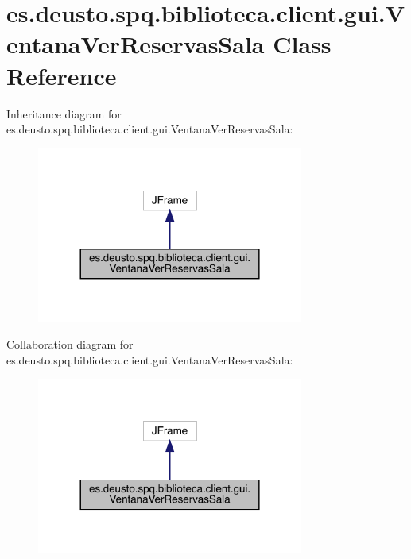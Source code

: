 \hypertarget{classes_1_1deusto_1_1spq_1_1biblioteca_1_1client_1_1gui_1_1_ventana_ver_reservas_sala}{}\section{es.\+deusto.\+spq.\+biblioteca.\+client.\+gui.\+Ventana\+Ver\+Reservas\+Sala Class Reference}
\label{classes_1_1deusto_1_1spq_1_1biblioteca_1_1client_1_1gui_1_1_ventana_ver_reservas_sala}


Inheritance diagram for es.\+deusto.\+spq.\+biblioteca.\+client.\+gui.\+Ventana\+Ver\+Reservas\+Sala\+:
\nopagebreak
\begin{figure}[H]
\begin{center}
\leavevmode
\includegraphics[width=248pt]{classes_1_1deusto_1_1spq_1_1biblioteca_1_1client_1_1gui_1_1_ventana_ver_reservas_sala__inherit__graph}
\end{center}
\end{figure}


Collaboration diagram for es.\+deusto.\+spq.\+biblioteca.\+client.\+gui.\+Ventana\+Ver\+Reservas\+Sala\+:
\nopagebreak
\begin{figure}[H]
\begin{center}
\leavevmode
\includegraphics[width=248pt]{classes_1_1deusto_1_1spq_1_1biblioteca_1_1client_1_1gui_1_1_ventana_ver_reservas_sala__coll__graph}
\end{center}
\end{figure}
